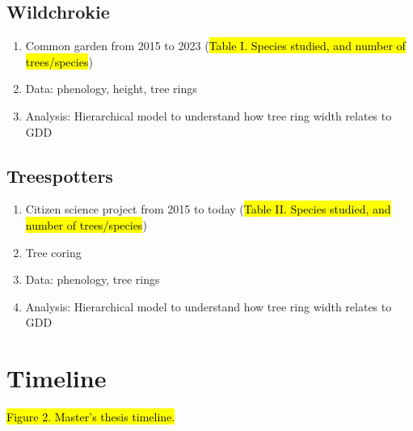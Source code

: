 \documentclass{article}
\begin{document}
\subsection{Wildchrokie}
\begin {enumerate}
	\item Common garden from 2015 to 2023 (\hl{Table I. Species studied, and number of trees/species})
	\item Data: phenology, height, tree rings
	\item Analysis: Hierarchical model to understand how tree ring width relates to GDD
\end {enumerate}

\subsection{Treespotters}
\begin {enumerate}
	\item Citizen science project from 2015 to today (\hl{Table II. Species studied, and number of trees/species})
	\item Tree coring
	\item Data: phenology, tree rings
	\item Analysis: Hierarchical model to understand how tree ring width relates to GDD	
\end {enumerate}

\section{Timeline}
\hl{Figure 2. Master's thesis timeline.}

\end{document}
